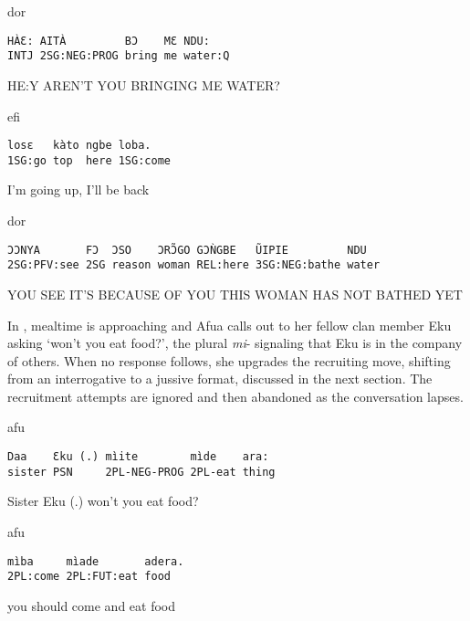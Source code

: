 \documentclass[output=paper]{langsci/langscibook}
\begin{document}
\vspace{-1mm}
%
\begin{mdframednoverticalspace}[style=firstfoc]
\begin{transbox}{1}{dor}
\begin{verbatim}
HÀƐ: AITÀ         BƆ    MƐ NDU:
INTJ 2SG:NEG:PROG bring me water:Q
\end{verbatim}
HE:Y AREN'T YOU BRINGING ME WATER?
\end{transbox}
\end{mdframednoverticalspace}
%
\vspace{-2mm}
%
\begin{transbox}{3}{efi}
\begin{verbatim}
losɛ   kàto ngbe loba.
1SG:go top  here 1SG:come
\end{verbatim}
I'm going up, I’ll be back
\end{transbox}
%
\vspace{-3mm}
%
\begin{transbox}{5}{dor}
\begin{verbatim}
ƆƆNYA       FƆ  ƆSO    ƆRƆ̃GO GƆǸGBE   ŨIPIE         NDU
2SG:PFV:see 2SG reason woman REL:here 3SG:NEG:bathe water
\end{verbatim}
YOU SEE IT'S BECAUSE OF YOU THIS WOMAN HAS NOT BATHED YET
\end{transbox}\bigskip

\normalsize
In , mealtime is approaching and Afua calls out to her fellow clan member Eku asking ‘won’t you eat food?’, the plural \textit{mi}- signaling that Eku is in the company of others. When no response follows, she upgrades the recruiting move, shifting from an interrogative to a jussive format, discussed in the next section. The recruitment attempts are ignored and then abandoned as the conversation lapses.

\vspace{-1mm}
%
\begin{mdframednoverticalspace}[style=firstfoc]
\begin{transbox}{1}{afu}
\begin{verbatim}
Daa    Ɛku (.) mìite        mìde    ara:
sister PSN     2PL-NEG-PROG 2PL-eat thing
\end{verbatim}
Sister Eku (.) won’t you eat food?
\end{transbox}
\end{mdframednoverticalspace}
%
%
\begin{mdframednoverticalspace}[style=firstfoc]
\begin{transbox}{3}{afu}
\begin{verbatim}
mìba     mìade       adera.
2PL:come 2PL:FUT:eat food
\end{verbatim}
you should come and eat food
\end{transbox}
\end{mdframednoverticalspace}
%
\end{document}

